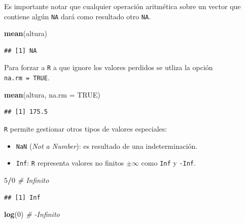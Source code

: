 \documentclass[]{book}
\newenvironment{Shaded}{\begin{snugshade}}{\end{snugshade}}
\newcommand{\KeywordTok}[1]{\textcolor[rgb]{0.13,0.29,0.53}{\textbf{#1}}}
\newcommand{\DataTypeTok}[1]{\textcolor[rgb]{0.13,0.29,0.53}{#1}}
\newcommand{\DecValTok}[1]{\textcolor[rgb]{0.00,0.00,0.81}{#1}}
\newcommand{\CommentTok}[1]{\textcolor[rgb]{0.56,0.35,0.01}{\textit{#1}}}
\newcommand{\OtherTok}[1]{\textcolor[rgb]{0.56,0.35,0.01}{#1}}
\newcommand{\OperatorTok}[1]{\textcolor[rgb]{0.81,0.36,0.00}{\textbf{#1}}}
\newcommand{\NormalTok}[1]{#1}
\begin{document}
Es importante notar que cualquier operación aritmética sobre un vector
que contiene algún \texttt{NA} dará como resultado otro \texttt{NA}.

\begin{Shaded}
\begin{Highlighting}[]
\KeywordTok{mean}\NormalTok{(altura)}
\end{Highlighting}
\end{Shaded}

\begin{verbatim}
## [1] NA
\end{verbatim}

Para forzar a \texttt{R} a que ignore los valores perdidos se utliza la
opción \texttt{na.rm\ =\ TRUE}.

\begin{Shaded}
\begin{Highlighting}[]
\KeywordTok{mean}\NormalTok{(altura, }\DataTypeTok{na.rm =} \OtherTok{TRUE}\NormalTok{)}
\end{Highlighting}
\end{Shaded}

\begin{verbatim}
## [1] 175.5
\end{verbatim}

\texttt{R} permite gestionar otros tipos de valores especiales:

\begin{itemize}
\item
  \texttt{NaN} (\emph{Not a Number}): es resultado de una
  indeterminación.
\item
  \texttt{Inf}: \texttt{R} representa valores no finitos \(\pm \infty\)
  como \texttt{Inf} y \texttt{-Inf}.
\end{itemize}

 \vspace*{0.3cm}

\begin{Shaded}
\begin{Highlighting}[]
\DecValTok{5}\OperatorTok{/}\DecValTok{0}  \CommentTok{# Infinito}
\end{Highlighting}
\end{Shaded}

\begin{verbatim}
## [1] Inf
\end{verbatim}

\begin{Shaded}
\begin{Highlighting}[]
\KeywordTok{log}\NormalTok{(}\DecValTok{0}\NormalTok{)  }\CommentTok{# -Infinito}
\end{Highlighting}
\end{Shaded}
\end{document}
